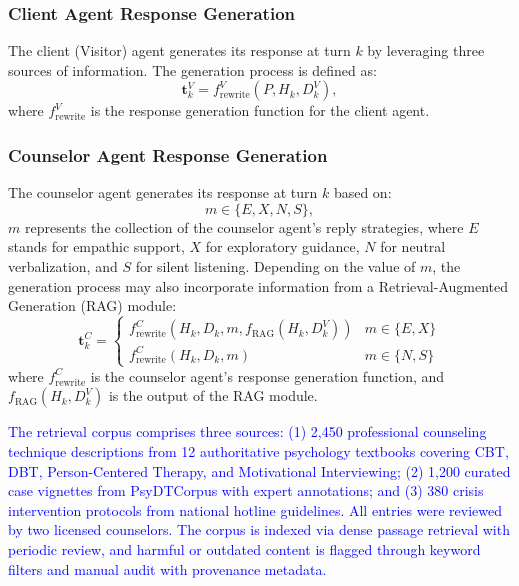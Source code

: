 \documentclass[lettersize,journal]{IEEEtran}
\newcommand{\blue}[1]{\textcolor{blue}{#1}}
\begin{document}
\subsubsection{Client Agent Response Generation} The client (Visitor) agent generates its response at turn $k$ by leveraging three sources of information.
The generation process is defined as:
\begin{equation}
\mathbf{t}_{k}^{V} = f_{\text{rewrite}}^{V}(P, H_{k}, D_{k}^{V}),
\end{equation}
where $f_{\text{rewrite}}^{V}$ is the response generation function for the client agent.

\subsubsection{Counselor Agent Response Generation} The counselor agent generates its response at turn $k$ based on:
\begin{equation}
m \in \{E, X, N, S\},
\end{equation}
$m$ represents the collection of the counselor agent's reply strategies, where $E$ stands for empathic support, $X$ for exploratory guidance, $N$ for neutral verbalization, and $S$ for silent listening.
Depending on the value of $m$, the generation process may also incorporate information from a Retrieval-Augmented Generation (RAG) module:
\begin{equation}
\mathbf{t}_{k}^{C} = \begin{cases} f_{\text{rewrite}}^{C}(H_{k}, D_{k}, m, f_{\text{RAG}}(H_{k}, D_{k}^{V})) & m \in \{E, X\} \\ f_{\text{rewrite}}^{C}(H_{k}, D_{k}, m) & m \in \{N, S\} \end{cases}
\end{equation}
where $f_{\text{rewrite}}^{C}$ is the counselor agent's response generation function, and $f_{\text{RAG}}(H_k, D_k^V)$ is the output of the RAG module.

\blue{The retrieval corpus comprises three sources: (1) 2,450 professional counseling technique descriptions from 12 authoritative psychology textbooks covering CBT, DBT, Person-Centered Therapy, and Motivational Interviewing; (2) 1,200 curated case vignettes from PsyDTCorpus with expert annotations; and (3) 380 crisis intervention protocols from national hotline guidelines. All entries were reviewed by two licensed counselors. The corpus is indexed via dense passage retrieval with periodic review, and harmful or outdated content is flagged through keyword filters and manual audit with provenance metadata.}
\end{document}
